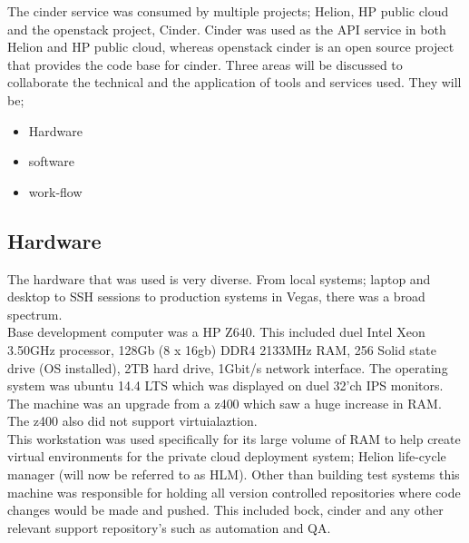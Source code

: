 \documentclass[11pt,a4paper]{report}
\begin{document}



The cinder service was consumed by multiple projects; Helion, HP public cloud and the openstack project, Cinder. Cinder was used as the API service in both Helion and HP public cloud, whereas openstack cinder is an open source project that provides the code base for cinder. Three areas will be discussed to collaborate the technical and the application of tools and services used. They will be;

\begin{itemize}
\item Hardware
\item software
\item work-flow
\end{itemize} 

\subsection{Hardware}
The hardware that was used is very diverse. From local systems; laptop and desktop to SSH sessions to production systems in Vegas, there was a broad spectrum.\\

Base development computer was a HP Z640. This included duel Intel Xeon 3.50GHz processor, 128Gb (8 x 16gb) DDR4 2133MHz RAM, 256 Solid state drive (OS installed), 2TB hard drive, 1Gbit/s network interface. The operating system was ubuntu 14.4 LTS which was displayed on duel 32'ch IPS monitors. The machine was an upgrade from a z400 which saw a huge increase in RAM. The z400 also did not support virtuialaztion.\\ This workstation was used specifically for its large volume of RAM to help create virtual environments for the private cloud deployment system; Helion life-cycle manager (will now be referred to as HLM). Other than building test systems this machine was responsible for holding all version controlled repositories where code changes would be made and pushed. This included bock, cinder and any other relevant support repository’s such as automation and QA. \\
\end{document}
